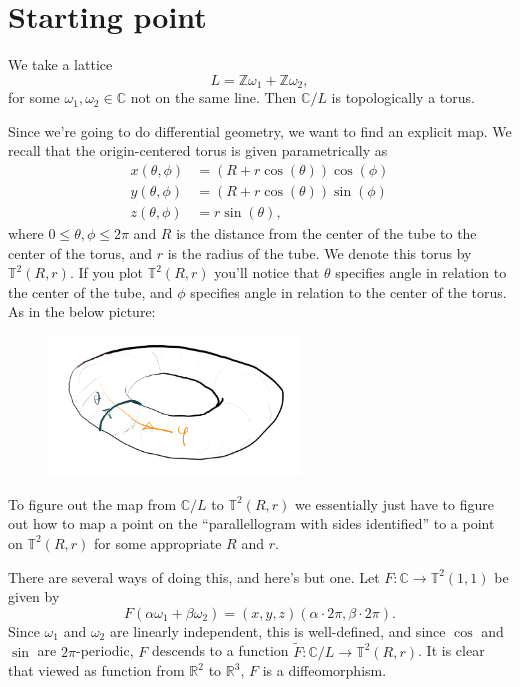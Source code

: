 \documentclass{article}
\theoremstyle{definition}
\begin{document}
\section{Starting point}
We take a lattice
\[L=\mathbb{Z}\omega_1+\mathbb{Z}\omega_2,\]
for some $\omega_1,\omega_2\in\mathbb{C}$ not on the same line. Then $\mathbb{C}/L$ is topologically a torus.

Since we're going to do differential geometry, we want to find an explicit map. We recall that the origin-centered torus is given parametrically as
\begin{align*}
  x(\theta,\phi)&=(R+r\cos(\theta))\cos(\phi)\\
  y(\theta,\phi)&=(R+r\cos(\theta))\sin(\phi)\\
  z(\theta,\phi)&=r\sin(\theta),
\end{align*}
where $0\leq\theta,\phi\leq 2\pi$ and $R$ is the distance from the center of the tube to the center of the torus, and $r$ is the radius of the tube. We denote this torus by $\mathbb{T}^2(R,r)$. If you plot $\mathbb{T}^2(R,r)$ you'll notice that $\theta$ specifies angle in relation to the center of the tube, and $\phi$ specifies angle in relation to the center of the torus. As in the below picture:

\begin{figure}[h]
  \centering
  \includegraphics[width=0.6\textwidth]{theta_phi.png}
\end{figure}

To figure out the map from $\mathbb{C}/L$ to $\mathbb{T}^2(R,r)$ we essentially just have to figure out how to map a point on the ``parallellogram with sides identified'' to a point on $\mathbb{T}^2(R,r)$ for some appropriate $R$ and $r$.

There are several ways of doing this, and here's but one. Let $F:\mathbb{C}\to\mathbb{T}^2(1,1)$ be given by
\[F(\alpha\omega_1+\beta\omega_2)=(x,y,z)(\alpha\cdot2\pi,\beta\cdot2\pi).\]
Since $\omega_1$ and $\omega_2$ are linearly independent, this is well-defined, and since $\cos$ and $\sin$ are $2\pi$-periodic, $F$ descends to a function $\tilde{F}:\mathbb{C}/L\to\mathbb{T}^2(R,r)$. It is clear that viewed as function from $\mathbb{R}^2$ to $\mathbb{R}^3$, $F$ is a diffeomorphism.
\end{document}
